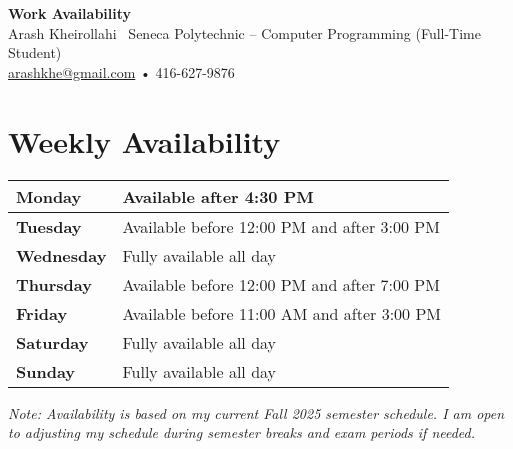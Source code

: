 \documentclass[letterpaper,11pt]{article}
\begin{document}
\begin{center}
    {\LARGE \textbf{Work Availability}} \\[0.5em]
    Arash Kheirollahi \
    Seneca Polytechnic – Computer Programming (Full-Time Student) \\
    \href{mailto:arashkhe@gmail.com}{arashkhe@gmail.com} • 416-627-9876
\end{center}

\vspace{1em}

\section*{Weekly Availability}

\begin{tabular}{|>{\raggedright}p{1.5in}|p{4in}|}
\hline
\textbf{Monday} & Available after 4:30 PM \\
\hline
\textbf{Tuesday} & Available before 12:00 PM and after 3:00 PM \\
\hline
\textbf{Wednesday} & Fully available all day \\
\hline
\textbf{Thursday} & Available before 12:00 PM and after 7:00 PM\\
\hline
\textbf{Friday} & Available before 11:00 AM and after 3:00 PM \\
\hline
\textbf{Saturday} & Fully available all day \\
\hline
\textbf{Sunday} & Fully available all day \\
\hline
\end{tabular}

\vspace{1.5em}

\textit{Note: Availability is based on my current Fall 2025 semester schedule. I am open to adjusting my schedule during semester breaks and exam periods if needed.}
\end{document}
